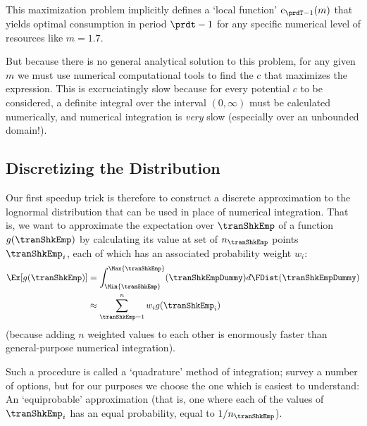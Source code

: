 \documentclass[titlepage, headings=optiontotocandhead]{econtex}
\newcommand{\ifcode}{\ifthenelse{\boolean{realcode}}}
\begin{document}
\ifcode{
    
    }{}

This maximization problem implicitly defines a `local function' $\mathrm{c}_{\prdT-1}(m)$ that yields optimal consumption in period $\prdt-1$ for any specific numerical level of resources like $m=1.7$.%

But because there is no general analytical solution to this problem, for any given $m$ we must use numerical computational tools to find the $c$ that maximizes the expression.  This is excruciatingly slow because for every potential $c$ to be considered, a definite integral over the interval $(0,\infty)$ must be calculated numerically, and numerical integration is \textit{very} slow (especially over an unbounded domain!).

\hypertarget{discretizing-the-distribution}{}
\subsection{Discretizing the Distribution}
Our first speedup trick is therefore to construct a discrete approximation to the lognormal distribution that can be used in place of numerical integration.  That is, we want to approximate the expectation over $\tranShkEmp$ of a function $g(\tranShkEmp)$ by calculating its value at set of $n_{\tranShkEmp}$ points $\tranShkEmp_{i}$, each of which has an associated probability weight $w_{i}$:
\begin{equation*}\begin{gathered}\begin{aligned}
      \Ex[g(\tranShkEmp)] & = \int_{\Min{\tranShkEmp}}^{\Max{\tranShkEmp}}(\tranShkEmpDummy)d\FDist(\tranShkEmpDummy) \\
      & \approx \sum_{\tranShkEmp = 1}^{n}w_{i}g(\tranShkEmp_{i})
    \end{aligned}\end{gathered}\end{equation*}
(because adding $n$ weighted values to each other is enormously faster than general-purpose numerical integration).

Such a procedure is called a `quadrature' method of integration; \cite{Tanaka2013-bc} survey a number of options, but for our purposes we choose the one which is easiest to understand: An `equiprobable' approximation (that is, one where each of the values of $\tranShkEmp_{i}$ has an equal probability, equal to $1/n_{\tranShkEmp}$).
\end{document}
